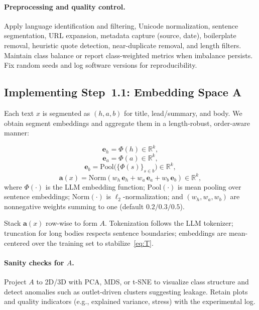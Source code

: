 \documentclass[ai,article,submit,pdftex,moreauthors]{Definitions/mdpi}
\begin{document}
\paragraph{Preprocessing and quality control.}
Apply language identification and filtering, Unicode normalization, sentence segmentation, URL expansion, metadata capture (source, date), boilerplate removal, heuristic quote detection, near-duplicate removal, and length filters. Maintain class balance or report class-weighted metrics when imbalance persists. Fix random seeds and log software versions for reproducibility.

\subsection{Implementing Step~1.1: Embedding Space A}\label{subsec:embeddings}
Each text $x$ is segmented as $(h,a,b)$ for title, lead/summary, and body. We obtain segment embeddings and aggregate them in a length-robust, order-aware manner:

\begin{equation}
\mathbf{e}_h = \Phi(h) \in \mathbb{R}^{k},
\end{equation}
\begin{equation}
\mathbf{e}_a = \Phi(a) \in \mathbb{R}^{k},
\end{equation}
\begin{equation}
\mathbf{e}_b = \mathrm{Pool}\big(\{\Phi(s)\}_{s\in b}\big) \in \mathbb{R}^{k},
\end{equation}
\begin{equation}\label{eq:agg}
\mathbf{a}(x) = \mathrm{Norm}\!\left(w_h\,\mathbf{e}_h + w_a\,\mathbf{e}_a + w_b\,\mathbf{e}_b\right)\in\mathbb{R}^{k},
\end{equation}
where $\Phi(\cdot)$ is the LLM embedding function; $\mathrm{Pool}(\cdot)$ is mean pooling over sentence embeddings; $\mathrm{Norm}(\cdot)$ is $\ell_2$-normalization; and $(w_h,w_a,w_b)$ are nonnegative weights summing to one (default $0.2/0.3/0.5$).

Stack $\mathbf{a}(x)$ row-wise to form $A$. Tokenization follows the LLM tokenizer; truncation for long bodies respects sentence boundaries; embeddings are mean-centered over the training set to stabilize~\eqref{eq:T}.

\paragraph{Sanity checks for $A$.}
Project $A$ to 2D/3D with PCA, MDS, or t-SNE to visualize class structure and detect anomalies such as outlet-driven clusters suggesting leakage. Retain plots and quality indicators (e.g., explained variance, stress) with the experimental log.
\end{document}
